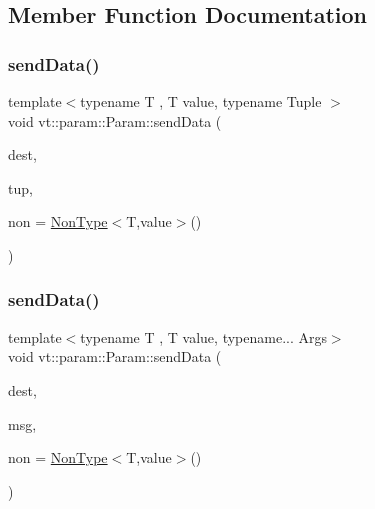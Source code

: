 \subsection{Member Function Documentation}
\mbox{\label{structvt_1_1param_1_1_param_a6b2fedacd76ee622efdb14038b0d82fe}} 
\subsubsection{\texorpdfstring{send\+Data()}{sendData()}\hspace{0.1cm}{\footnotesize\ttfamily [1/7]}}
{\footnotesize\ttfamily template$<$typename T , T value, typename Tuple $>$ \\
void vt\+::param\+::\+Param\+::send\+Data (\begin{DoxyParamCaption}\item[{\hyperlink{namespacevt_a866da9d0efc19c0a1ce79e9e492f47e2}{Node\+Type} const \&}]{dest,  }\item[{Tuple}]{tup,  }\item[{\hyperlink{structvt_1_1param_1_1_non_type}{Non\+Type}$<$ T, value $>$ \+\_\+\+\_\+attribute\+\_\+\+\_\+((unused))}]{non = {\ttfamily \hyperlink{structvt_1_1param_1_1_non_type}{Non\+Type}$<$T,value$>$()} }\end{DoxyParamCaption})\hspace{0.3cm}{\ttfamily [inline]}}

\mbox{\label{structvt_1_1param_1_1_param_af0791eb37c18d175bdcce5e2f2384427}} 
\subsubsection{\texorpdfstring{send\+Data()}{sendData()}\hspace{0.1cm}{\footnotesize\ttfamily [2/7]}}
{\footnotesize\ttfamily template$<$typename T , T value, typename... Args$>$ \\
void vt\+::param\+::\+Param\+::send\+Data (\begin{DoxyParamCaption}\item[{\hyperlink{namespacevt_a866da9d0efc19c0a1ce79e9e492f47e2}{Node\+Type} const \&}]{dest,  }\item[{\hyperlink{namespacevt_ab2b3d506ec8e8d1540aede826d84a239}{Msg\+Shared\+Ptr}$<$ \hyperlink{structvt_1_1param_1_1_data_msg}{Data\+Msg}$<$ std\+::tuple$<$ Args... $>$$>$$>$}]{msg,  }\item[{\hyperlink{structvt_1_1param_1_1_non_type}{Non\+Type}$<$ T, value $>$ \+\_\+\+\_\+attribute\+\_\+\+\_\+((unused))}]{non = {\ttfamily \hyperlink{structvt_1_1param_1_1_non_type}{Non\+Type}$<$T,value$>$()} }\end{DoxyParamCaption})\hspace{0.3cm}{\ttfamily [inline]}}

